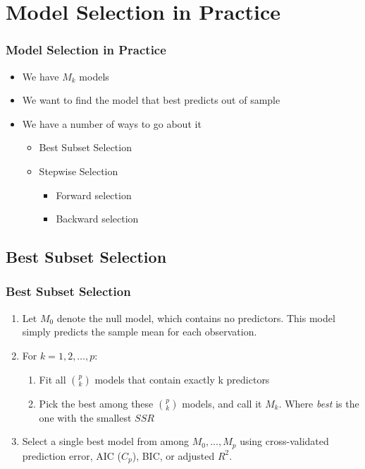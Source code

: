 \documentclass[
  shownotes,
  xcolor={svgnames},
  hyperref={colorlinks,citecolor=DarkBlue,linkcolor=DarkRed,urlcolor=DarkBlue}
  ]{beamer}
\begin{document}
\section{Model Selection in Practice}
\begin{frame}[fragile]
\frametitle{Model Selection in Practice}

\begin{itemize}
\item We have $M_k$ models 
\bigskip
\item We want to find the model that best predicts out of sample
\bigskip
\item We have a number of ways to go about it
\bigskip
\begin{itemize}
  \item Best Subset Selection
  \medskip
  \item Stepwise Selection
  \begin{itemize}
    \item Forward selection
    \medskip
    \item Backward selection
  \end{itemize}
\end{itemize}
\end{itemize}
\end{frame}
\subsection{Best Subset Selection}
\begin{frame}[fragile]
\frametitle{Best Subset Selection}
\begin{enumerate}
\item Let $M_0$ denote the null model, which contains no predictors. This model simply predicts the sample mean for each observation.
\bigskip
\item  For $k=1,2,\dots,p$:
\medskip
\begin{enumerate}
 \item Fit all $\binom{p}{k}$ models that contain exactly k predictors
 \medskip
 \item Pick the best among these $\binom{p}{k}$ models, and call it $M_k$. Where {\it best} is the one with the smallest $SSR$
\end{enumerate}
\bigskip
\item  Select a single best model from among $M_0,\dots, M_p$ using cross-validated prediction error, AIC ($C_p$), BIC, or adjusted $R^2$.
\end{enumerate}
 
 \end{frame}
\end{document}
